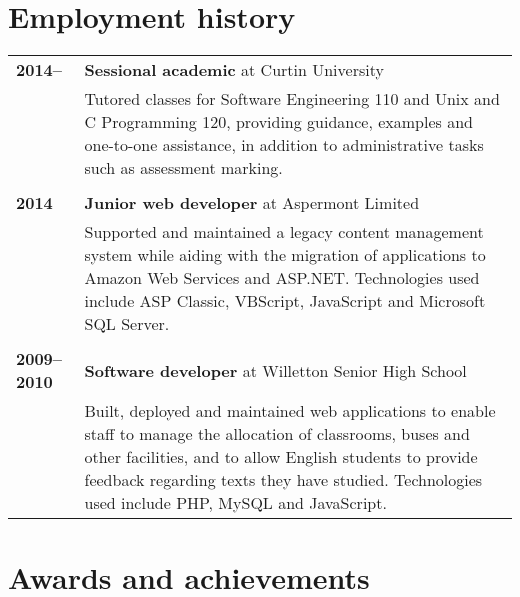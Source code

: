 \documentclass[a4paper,12pt]{article}
\begin{document}
\section*{Employment history}

\begin{tabular}{p{3.5cm}p{12.5cm}}
	\textbf{2014--} &
		\textbf{Sessional academic} at Curtin University\\ &
		Tutored classes for Software Engineering 110 and Unix and C
		Programming 120, providing guidance, examples and one-to-one
		assistance, in addition to administrative tasks such as
		assessment marking.\\\\
	\textbf{2014} &
		\textbf{Junior web developer} at Aspermont Limited\\ &
		Supported and maintained a legacy content management system
		while aiding with the migration of applications to Amazon Web
		Services and ASP.NET. Technologies used include ASP Classic,
		VBScript, JavaScript and Microsoft SQL Server.\\\\
	\textbf{2009--2010} &
		\textbf{Software developer} at Willetton Senior High School\\ &
		Built, deployed and maintained web applications to enable staff
		to manage the allocation of classrooms, buses and other
		facilities, and to allow English students to provide feedback
		regarding texts they have studied. Technologies used include
		PHP, MySQL and JavaScript.\\
\end{tabular}

\section*{Awards and achievements}
\end{document}
